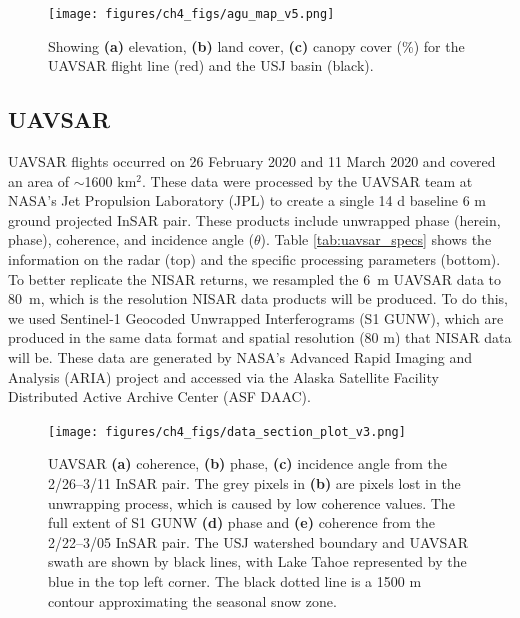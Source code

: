 \begin{figure}[ht]
\texttt{[image: figures/ch4\_figs/agu\_map\_v5.png]}
\centering
\caption{Showing \textbf{(a)} elevation, \textbf{(b)} land cover, \textbf{(c)} canopy cover (\%) for the UAVSAR flight line (red) and the USJ basin (black).}
\label{fig:multisensor_study_area}
\end{figure}
\clearpage


\hypertarget{ch4-methods-1}{\subsection{UAVSAR}\label{ch4-methods-1}}

UAVSAR flights occurred on 26 February 2020 and 11 March 2020 and covered an area of $\sim$1600 km$^{2}$. These data were processed by the UAVSAR team at NASA's Jet Propulsion Laboratory (JPL) to create a single 14 d baseline 6 m ground projected InSAR pair. These products include unwrapped phase (herein, phase), coherence, and incidence angle ($\theta$). Table \ref{tab:uavsar_specs} shows the information on the radar (top) and the specific processing parameters (bottom). To better replicate the NISAR returns, we resampled the 6~m UAVSAR data to 80~m, which is the resolution NISAR data products will be produced. To do this, we used Sentinel-1 Geocoded Unwrapped Interferograms (S1 GUNW), which are produced in the same data format and spatial resolution (80 m) that NISAR data will be. These data are generated by NASA's Advanced Rapid Imaging and Analysis (ARIA) \citep{bekaertDevelopmentDisseminationStandardized2019,buzzangaSustainedMonitoringSubsidence2020} project and accessed via the Alaska Satellite Facility Distributed Active Archive Center (ASF DAAC).


\begin{figure}[ht]
\texttt{[image: figures/ch4\_figs/data\_section\_plot\_v3.png]}
\centering
\caption{UAVSAR \textbf{(a)} coherence, \textbf{(b)} phase, \textbf{(c)} incidence angle from the 2/26--3/11 InSAR pair. The grey pixels in \textbf{(b)} are pixels lost in the unwrapping process, which is caused by low coherence values. The full extent of S1 GUNW \textbf{(d)} phase and \textbf{(e)} coherence from the 2/22--3/05 InSAR pair. The USJ watershed boundary and UAVSAR swath are shown by black lines, with Lake Tahoe represented by the blue in the top left corner. The black dotted line is a 1500 m contour approximating the seasonal snow zone.}
\label{fig:uavsar_cor_inc_phase_plot}
\end{figure}
\clearpage

